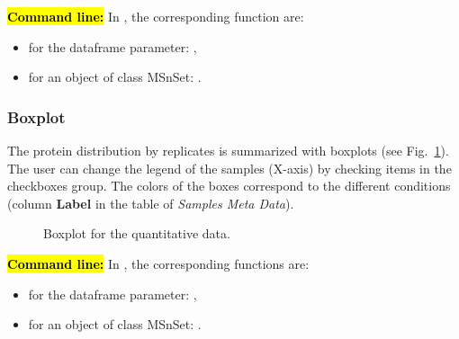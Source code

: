\documentclass[12pt]{article}
\begin{document}
\hl{\bf Command line:} In , the corresponding function are:
\begin{itemize}
\item for the dataframe parameter: ,
\item for an object of class MSnSet: .
\end{itemize}


\subsubsection {Boxplot}\label{sec:boxplot}

The protein distribution by replicates is summarized with boxplots (see Fig.~\ref{fig:boxplot}). The user can change the legend of the samples (X-axis) by checking items in the checkboxes group. The colors of the boxes correspond to the different conditions (column \textbf{Label} in the table of \emph {Samples Meta Data}).

\begin {figure}
\centering
{}
\caption{Boxplot for the quantitative data.}\label{fig:boxplot}
\end {figure}



\hl{\bf Command line:} In , the corresponding functions are:
\begin{itemize}
\item for the dataframe parameter: ,
\item for an object of class MSnSet: .
\end{itemize}

\end{document}
